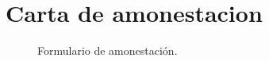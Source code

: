 \appendix
\pagestyle{formato-PI}
\renewcommand{\MayorVer}{1}
\renewcommand{\MenorVer}{0}
\renewcommand{\Codigo}{BPD-AP-A}
\renewcommand{\FechaPub}{2023--01}
\renewcommand{\Titulo}{Carta de amonestacion}

\section{\Titulo}
\label{AP1}
\begin{figure}[H]
	\centering
    \label{F-amonest}
	\caption{Formulario de amonestación.}
\end{figure}